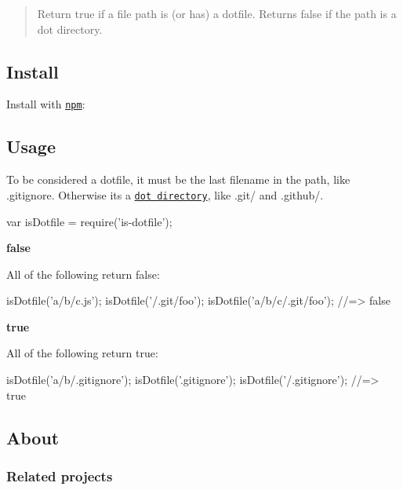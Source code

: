 \begin{quote}
Return true if a file path is (or has) a dotfile. Returns false if the path is a dot directory. \end{quote}


\subsection*{Install}

Install with \href{https://www.npmjs.com/}{\tt npm}\+:




\subsection*{Usage}

To be considered a dotfile, it must be the last filename in the path, like {\ttfamily .gitignore}. Otherwise it\textquotesingle{}s a \href{https://github.com/jonschlinkert/is-dotdir}{\tt dot directory}, like {\ttfamily .git/} and {\ttfamily .github/}.


\begin{DoxyCode}
var isDotfile = require('is-dotfile');
\end{DoxyCode}


{\bfseries false}

All of the following return {\ttfamily false}\+:


\begin{DoxyCode}
isDotfile('a/b/c.js');
isDotfile('/.git/foo');
isDotfile('a/b/c/.git/foo');
//=> false
\end{DoxyCode}


{\bfseries true}

All of the following return {\ttfamily true}\+:


\begin{DoxyCode}
isDotfile('a/b/.gitignore');
isDotfile('.gitignore');
isDotfile('/.gitignore');
//=> true
\end{DoxyCode}


\subsection*{About}

\subsubsection*{Related projects}


